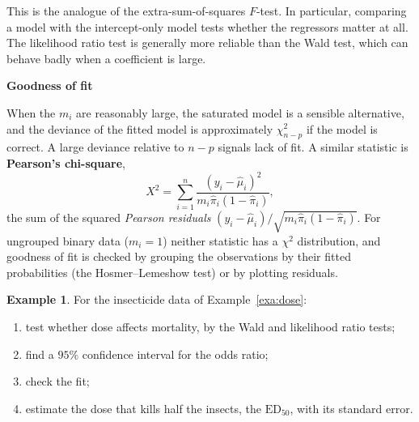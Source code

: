 \documentclass[11pt,a4paper]{article}
\numberwithin{equation}{section}
\theoremstyle{definition}
\newtheorem{exa}[thm]{Example}
\newcommand{\subhead}[1]{%
  \par\medskip\noindent\textbf{#1}\par\nobreak\smallskip}
\begin{document}
This is the analogue of the extra-sum-of-squares $F$-test. In particular, comparing a model with the
intercept-only model tests whether the regressors matter at all. The likelihood ratio test is generally more
reliable than the Wald test, which can behave badly when a coefficient is large.

\subhead{Goodness of fit}
When the $m_i$ are reasonably large, the saturated model is a sensible alternative, and the deviance of the
fitted model is approximately $\chi^2_{n-p}$ if the model is correct. A large deviance relative to $n - p$
signals lack of fit. A similar statistic is \textbf{Pearson's chi-square},
\[
X^2 = \sum_{i=1}^n \frac{(y_i - \hat\mu_i)^2}{m_i\hat\pi_i(1 - \hat\pi_i)} ,
\]
the sum of the squared \emph{Pearson residuals} $(y_i - \hat\mu_i)/\sqrt{m_i\hat\pi_i(1 - \hat\pi_i)}$. For ungrouped binary data ($m_i = 1$)
neither statistic has a $\chi^2$ distribution, and goodness of fit is checked by grouping the observations by their
fitted probabilities (the Hosmer--Lemeshow test) or by plotting residuals.

\begin{exa}\label{exa:dose-inference}
For the insecticide data of Example~\ref{exa:dose}:
\begin{enumerate}[label=(\alph*)]
\item test whether dose affects mortality, by the Wald and likelihood ratio tests;
\item find a $95\%$ confidence interval for the odds ratio;
\item check the fit;
\item estimate the dose that kills half the insects, the $\mathrm{ED}_{50}$, with its standard error.
\end{enumerate}
\end{exa}
\end{document}
